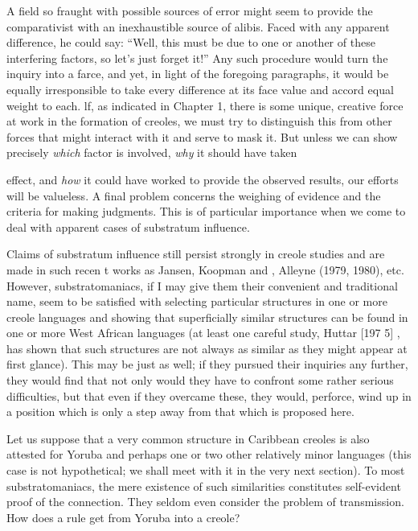 A field so fraught with possible sources of error might seem to provide the comparativist with an inexhaustible source of alibis. Faced with any apparent difference, he could say: ``Well, this must be due to one or another of these interfering factors, so let's just forget it!'' Any such procedure would turn the inquiry into a farce, and yet, in light of the foregoing paragraphs, it would be equally irresponsible to take every difference at its face value and accord equal weight to each. lf, as indicated in Chapter 1, there is some unique, creative force at work in the formation of creoles, we must try to distinguish this from other forces that might interact with it and serve to mask it. But unless we can show precisely \textit{which} factor is involved, \textit{why} it should have taken

effect, and \textit{how} it could have worked to provide the observed results, our efforts will be valueless.
A final problem concerns the weighing of evidence and the criteria for making judgments. This is of particular importance when we come to deal with apparent cases of substratum influence.

Claims of substratum influence still persist strongly in creole studies and are made in such recen t works as Jansen, Koopman and \citet{Muysken1978}, Alleyne (1979, 1980), etc. However, substrato\-maniacs, if I may give them their convenient and traditional name, seem to be satisfied with selecting particular structures in one or more creole languages and showing that superficially similar structures can be found in one or more West African languages (at least one careful study, Huttar [197 5] , has shown that such structures are not always as similar as they might appear at first glance). This may be just as well; if they pursued their inquiries any further, they would find that not only would they have to confront some rather serious diffi\-culties, but that even if they overcame these, they would, perforce, wind up in a position which is only a step away from that which is proposed here.

Let us suppose that a very common structure in Caribbean creoles is also attested for Yoruba and perhaps one or two other rela\-tively minor languages (this case is not hypothetical; we shall meet with it in the very next section). To most substratomaniacs, the mere existence of such similarities constitutes self-evident proof of the connection. They seldom even consider the problem of transmission. How does a rule get from Yoruba into a creole?

